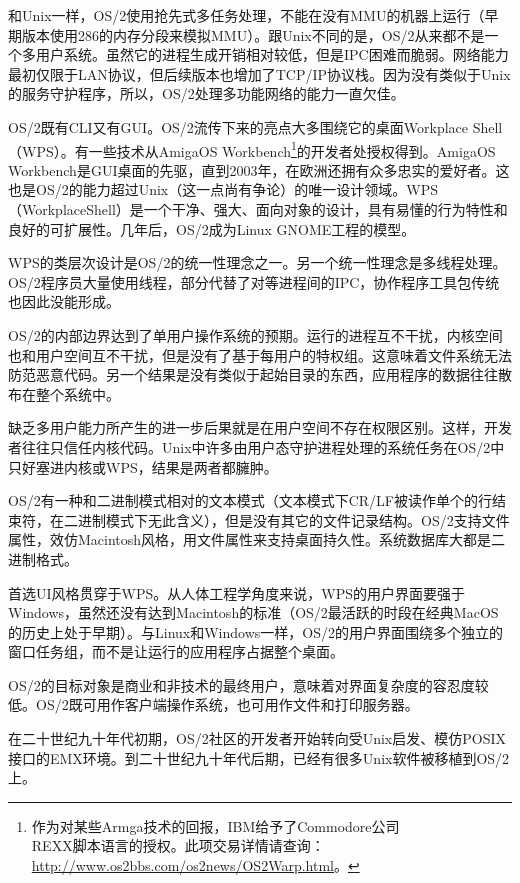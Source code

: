\documentclass[12pt,oneside]{book}
\begin{document}
和Unix一样，OS/2使用抢先式多任务处理，不能在没有MMU的机器上运行（早期版本使用286的内存分段来模拟MMU）。跟Unix不同的是，OS/2从来都不是一个多用户系统。虽然它的进程生成开销相对较低，但是IPC困难而脆弱。网络能力最初仅限于LAN协议，但后续版本也增加了TCP/IP协议栈。因为没有类似于Unix的服务守护程序，所以，OS/2处理多功能网络的能力一直欠佳。

OS/2既有CLI又有GUI。OS/2流传下来的亮点大多围绕它的桌面Workplace Shell（WPS）。有一些技术从AmigaOS Workbench\footnote{作为对某些Armga技术的回报，IBM给予了Commodore公司\\ REXX脚本语言的授权。此项交易详情请查询：\\ \href{http://www.os2bbs.com/os2news/OS2Warp.html}{http://www.os2bbs.com/os2news/OS2Warp.html}。}的开发者处授权得到。AmigaOS Workbench是GUI桌面的先驱，直到2003年，在欧洲还拥有众多忠实的爱好者。这也是OS/2的能力超过Unix（这一点尚有争论）的唯一设计领域。WPS（WorkplaceShell）是一个干净、强大、面向对象的设计，具有易懂的行为特性和良好的可扩展性。几年后，OS/2成为Linux GNOME工程的模型。

WPS的类层次设计是OS/2的统一性理念之一。另一个统一性理念是多线程处理。OS/2程序员大量使用线程，部分代替了对等进程间的IPC，协作程序工具包传统也因此没能形成。

OS/2的内部边界达到了单用户操作系统的预期。运行的进程互不干扰，内核空间也和用户空间互不干扰，但是没有了基于每用户的特权组。这意味着文件系统无法防范恶意代码。另一个结果是没有类似于起始目录的东西，应用程序的数据往往散布在整个系统中。

缺乏多用户能力所产生的进一步后果就是在用户空间不存在权限区别。这样，开发者往往只信任内核代码。Unix中许多由用户态守护进程处理的系统任务在OS/2中只好塞进内核或WPS，结果是两者都臃肿。

OS/2有一种和二进制模式相对的文本模式（文本模式下CR/LF被读作单个的行结束符，在二进制模式下无此含义），但是没有其它的文件记录结构。OS/2支持文件属性，效仿Macintosh风格，用文件属性来支持桌面持久性。系统数据库大都是二进制格式。

首选UI风格贯穿于WPS。从人体工程学角度来说，WPS的用户界面要强于Windows，虽然还没有达到Macintosh的标准（OS/2最活跃的时段在经典MacOS的历史上处于早期）。与Linux和Windows一样，OS/2的用户界面围绕多个独立的窗口任务组，而不是让运行的应用程序占据整个桌面。

OS/2的目标对象是商业和非技术的最终用户，意味着对界面复杂度的容忍度较低。OS/2既可用作客户端操作系统，也可用作文件和打印服务器。

在二十世纪九十年代初期，OS/2社区的开发者开始转向受Unix启发、模仿POSIX接口的EMX环境。到二十世纪九十年代后期，已经有很多Unix软件被移植到OS/2上。
\end{document}
